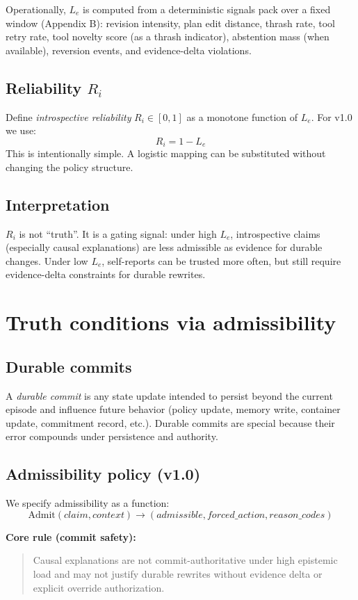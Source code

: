 \documentclass[11pt]{article}
\begin{document}
Operationally, $L_e$ is computed from a deterministic signals pack over a fixed window (Appendix B):
revision intensity, plan edit distance, thrash rate, tool retry rate, tool novelty score (as a thrash indicator),
abstention mass (when available), reversion events, and evidence-delta violations.

\subsection{Reliability $R_i$}
Define \emph{introspective reliability} $R_i \in [0,1]$ as a monotone function of $L_e$. For v1.0 we use:
\[
R_i = 1 - L_e
\]
This is intentionally simple. A logistic mapping can be substituted without changing the policy structure.

\subsection{Interpretation}
$R_i$ is not \enquote{truth}. It is a gating signal: under high $L_e$, introspective claims (especially causal
explanations) are less admissible as evidence for durable changes. Under low $L_e$, self-reports can be
trusted more often, but still require evidence-delta constraints for durable rewrites.

\section{Truth conditions via admissibility}
\subsection{Durable commits}
A \emph{durable commit} is any state update intended to persist beyond the current episode and influence
future behavior (policy update, memory write, container update, commitment record, etc.). Durable commits
are special because their error compounds under persistence and authority.

\subsection{Admissibility policy (v1.0)}
We specify admissibility as a function:
\[
\text{Admit}(claim, context) \rightarrow (admissible, forced\_action, reason\_codes)
\]

\textbf{Core rule (commit safety):}
\begin{quote}
Causal explanations are not commit-authoritative under high epistemic load and may not justify durable
rewrites without evidence delta or explicit override authorization.
\end{quote}
\end{document}
